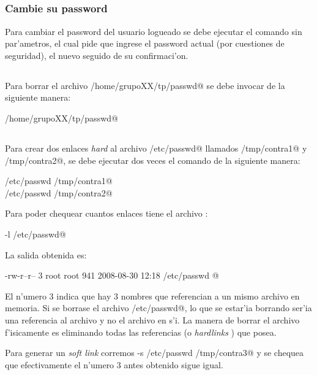 	\subsection{}
		\subsubsection[]{Cambie su password}
		
			Para cambiar el password del usuario logueado se debe ejecutar el comando \verb@passwd@ sin par'ametros, el cual pide que ingrese el password actual (por cuestiones de seguridad), el nuevo seguido de su confirmaci'on. 
			
	\subsection{}
	
		Para borrar el archivo \verb@/home/grupoXX/tp/passwd@ se debe invocar \verb@rm@ de la siguiente manera:

		\verb@rm /home/grupoXX/tp/passwd@
	
	\subsection{}

		Para crear dos enlaces \emph{hard} al archivo \verb@/etc/passwd@ llamados \verb@/tmp/contra1@ y \verb@/tmp/contra2@, se debe ejecutar dos veces el comando \verb@ln@ de la siguiente manera:

	\noindent \verb@ln /etc/passwd /tmp/contra1@\\
		\verb@ln /etc/passwd /tmp/contra2@

		Para poder chequear cuantos enlaces tiene el archivo \verb@\etc\passwd@:

		\verb@ls -l /etc/passwd@

	\noindent La salida obtenida es:

		\verb@-rw-r--r--  3 root     root      941 2008-08-30 12:18 /etc/passwd @

		El n'umero 3 indica que hay 3 nombres que referencian a un mismo archivo en memoria. Si se borrase el archivo \verb@/etc/passwd@, lo que se estar'ia borrando ser'ia una referencia al archivo y no el archivo en s'i. La manera de borrar el archivo f'isicamente es eliminando todas las referencias (o \emph{hardlinks} ) que posea.

    Para generar un \emph{soft link} corremos \verb@ln -s /etc/passwd /tmp/contra3@ y se chequea que efectivamente el n'umero 3 antes obtenido sigue igual.
    
